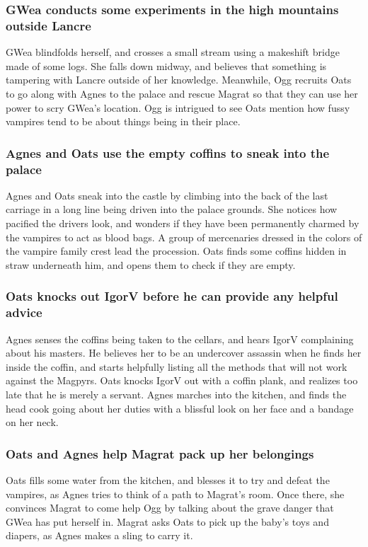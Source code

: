 \subsubsection{\Gls{GWea} conducts some experiments in the high mountains outside Lancre}
\Gls{GWea} blindfolds herself, and crosses a small stream using a makeshift bridge made of some
logs. She falls down midway, and believes that something is tampering with Lancre outside of her
knowledge. Meanwhile, \Gls{Ogg} recruits \Gls{Oats} to go along with \Gls{Agnes} to the palace and
rescue \Gls{Magrat} so that they can use her power to scry \Gls{GWea}'s location. \Gls{Ogg} is
intrigued to see \Gls{Oats} mention how fussy vampires tend to be about things being in their place.

\subsubsection{\Gls{Agnes} and \Gls{Oats} use the empty coffins to sneak into the palace}
\Gls{Agnes} and \Gls{Oats} sneak into the castle by climbing into the back of the last carriage in
a long line being driven into the palace grounds. She notices how pacified the drivers look, and
wonders if they have been permanently charmed by the vampires to act as blood bags. A group of
mercenaries dressed in the colors of the vampire family crest lead the procession. \Gls{Oats} finds
some coffins hidden in straw underneath him, and opens them to check if they are empty.

\subsubsection{\Gls{Oats} knocks out \Gls{IgorV} before he can provide any helpful advice}
\Gls{Agnes} senses the coffins being taken to the cellars, and hears \Gls{IgorV} complaining about
his masters. He believes her to be an undercover assassin when he finds her inside the coffin, and
starts helpfully listing all the methods that will not work against the Magpyrs. \Gls{Oats}
knocks \Gls{IgorV} out with a coffin plank, and realizes too late that he is merely a servant.
\Gls{Agnes} marches into the kitchen, and finds the head cook going about her duties with a blissful
look on her face and a bandage on her neck.

\subsubsection{\Gls{Oats} and \Gls{Agnes} help \Gls{Magrat} pack up her belongings}
\Gls{Oats} fills some water from the kitchen, and blesses it to try and defeat the vampires, as
\Gls{Agnes} tries to think of a path to \Gls{Magrat}'s room. Once there, she convinces \Gls{Magrat}
to come help \Gls{Ogg} by talking about the grave danger that \Gls{GWea} has put herself in.
\Gls{Magrat} asks \Gls{Oats} to pick up the baby's toys and diapers, as \Gls{Agnes} makes a sling
to carry it.

